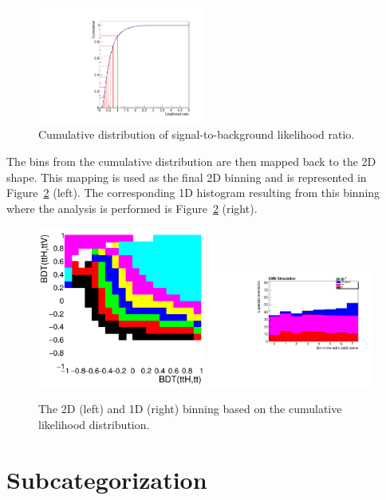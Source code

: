 \begin{figure}[htp]
\centering
\includegraphics[width=0.49\textwidth]{ch9_figs/cumulative_2lss.pdf}
\caption[Cumulative distribution of signal-to-background likelihood ratio]{Cumulative distribution of signal-to-background likelihood ratio.}
\label{fig:cum_dist}
\end{figure}

The bins from the cumulative distribution are then mapped back to the 2D shape. This mapping is used as the final 2D binning and is represented in Figure~\ref{fig:likelihood} (left).
The corresponding 1D histogram resulting from this binning where the analysis is performed is Figure~\ref{fig:likelihood} (right). 

\begin{figure}[htp]
\centering
\includegraphics[width=0.49\textwidth]{ch9_figs/likelihoodBased_2d_2lss.png}
\includegraphics[width=0.49\textwidth]{ch9_figs/likelihoodBased_1d_2lss.pdf}
\caption[The 2D and 1D binning based on the cumulative likelihood distribution]{The 2D (left) and 1D (right) binning based on the cumulative likelihood distribution.}
\label{fig:likelihood}
\end{figure}


\section{Subcategorization}


